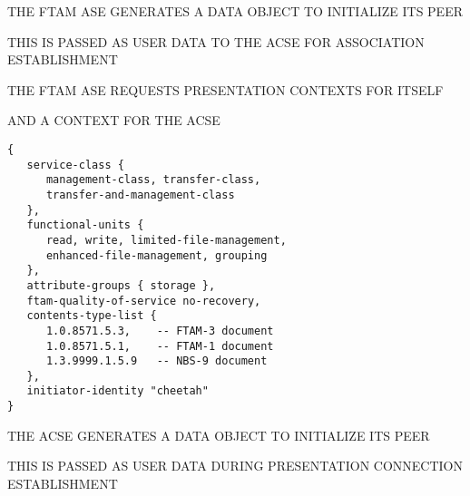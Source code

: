 

\begin{bwslide}

\begin{nrtc}
\item	THE FTAM ASE GENERATES A DATA OBJECT TO INITIALIZE ITS PEER

\item	THIS IS PASSED AS USER DATA TO THE ACSE FOR ASSOCIATION ESTABLISHMENT

\item	THE FTAM ASE REQUESTS PRESENTATION CONTEXTS FOR ITSELF
    \begin{nrtc}
    \item	AND A CONTEXT FOR THE ACSE
    \end{nrtc}
\end{nrtc}
\end{bwslide}


\begin{bwslide}

\smaller
\begin{verbatim}
{
   service-class {
      management-class, transfer-class,
      transfer-and-management-class
   },
   functional-units {
      read, write, limited-file-management,
      enhanced-file-management, grouping
   },
   attribute-groups { storage },
   ftam-quality-of-service no-recovery,
   contents-type-list {
      1.0.8571.5.3,    -- FTAM-3 document
      1.0.8571.5.1,    -- FTAM-1 document
      1.3.9999.1.5.9   -- NBS-9 document
   },
   initiator-identity "cheetah"
}
\end{verbatim}
\end{bwslide}


\begin{bwslide}

\begin{nrtc}
\item	THE ACSE GENERATES A DATA OBJECT TO INITIALIZE ITS PEER

\item	THIS IS PASSED AS USER DATA DURING PRESENTATION CONNECTION
	ESTABLISHMENT 
\end{nrtc}
\end{bwslide}



